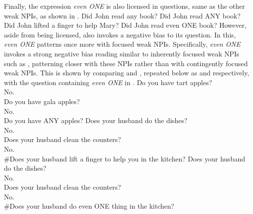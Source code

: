 Finally, the expression \textit{even \MakeUppercase{one}} is also licensed in questions, same as the other weak NPIs, as shown in .
\pex[nopreamble=true]\label{ex:even-question}%
\a{} Did John read any book?
\a{} Did John read \MakeUppercase{any} book?
\a{} Did John lifted a finger to help Mary?
\a{} Did John read even \MakeUppercase{one} book?
\xe
However, aside from being licensed,  also invokes a negative bias to its question. In this, \textit{even \MakeUppercase{one}} patterns once more with focused weak NPIs. Specifically, \textit{even \MakeUppercase{one}} invokes a strong negative bias reading similar to inherently focused weak NPIs such as , patterning closer with these NPIs rather than with contingently focused weak NPIs. This is shown by comparing  and , repeated below as  and  respectively, with the question containing \textit{even \MakeUppercase{one}} in .
\ex{}\label{ex:even-fruitstand}%
Do you have tart apples?\\
No.\\
Do you have gala apples?\\
No.\\
Do you have ANY apples?\hfill\parencites{Jeong2021}[p.~4]{Jeong2022}
\xe
\ex{}\label{ex:even-badminimiserQ}%
\phantom{\#}Does your husband do the dishes?\\
\phantom{\#}No.\\
\phantom{\#}Does your husband clean the counters?\\
\phantom{\#}No.\\
\#Does your husband lift a finger to help you in the kitchen?
\xe
\ex{}\label{ex:even-badoneQ}
\phantom{\#}Does your husband do the dishes?\\
\phantom{\#}No.\\
\phantom{\#}Does your husband clean the counters?\\
\phantom{\#}No.\\
\#Does your husband do even \MakeUppercase{one} thing in the kitchen?
\xe

